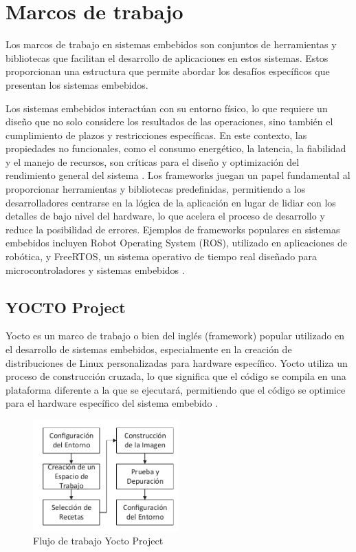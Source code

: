 \section{Marcos de trabajo}

Los marcos de trabajo en sistemas embebidos son conjuntos de herramientas y bibliotecas que facilitan el desarrollo de aplicaciones en estos 
sistemas. Estos proporcionan una estructura que permite abordar los desafíos específicos que presentan los sistemas embebidos.

Los sistemas embebidos interactúan con su entorno físico, lo que requiere un diseño que no solo considere los resultados de las operaciones, 
sino también el cumplimiento de plazos y restricciones específicas. En este contexto, las propiedades no funcionales, como el consumo energético, 
la latencia, la fiabilidad y el manejo de recursos, son críticas para el diseño y optimización del rendimiento general del sistema \cite{Marugn2017SimulacinYV}. Los frameworks 
juegan un papel fundamental al proporcionar herramientas y bibliotecas predefinidas, permitiendo a los desarrolladores centrarse en la lógica de la 
aplicación en lugar de lidiar con los detalles de bajo nivel del hardware, lo que acelera el proceso de desarrollo y reduce la posibilidad de errores. 
Ejemplos de frameworks populares en sistemas embebidos incluyen Robot Operating System (ROS), utilizado en aplicaciones de robótica, y FreeRTOS, 
un sistema operativo de tiempo real diseñado para microcontroladores y sistemas embebidos \cite{HerreraLpez2023EntornoDT}.

\subsection{YOCTO Project}\label{subsec:yocto}

Yocto es un marco de trabajo o bien del inglés (framework) popular utilizado en el desarrollo de sistemas embebidos, especialmente en la creación de distribuciones de Linux 
personalizadas para hardware específico. Yocto utiliza un proceso de construcción cruzada, lo que significa que el código se compila en una plataforma diferente 
a la que se ejecutará, permitiendo que el código se optimice para el hardware específico del sistema embebido \cite{Leppakoski2013FrameworkFI}.

\begin{figure}[h!]
    \centering
    \includegraphics[width=0.5\textwidth]{fig/teorico/Flujo de trabajo de yocto.pdf}
    \caption{Flujo de trabajo Yocto Project}
    \label{fig:yocto_project_workflow}
\end{figure}

